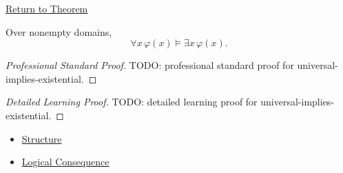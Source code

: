 \newpage
{}
\label{prf:universal-implies-existential}

\begin{remark*}[Return]
\hyperref[thm:universal-implies-existential]{Return to Theorem}
\end{remark*}

\begin{theorem*}
Over nonempty domains,
\[
\forall x\,\varphi(x)\models \exists x\,\varphi(x).
\]
\end{theorem*}

\begin{proof}[Professional Standard Proof]
\LRAProofBodyStart
TODO: professional standard proof for universal-implies-existential.
\end{proof}

\begin{proof}[Detailed Learning Proof]
\LRAProofBodyStart
TODO: detailed learning proof for universal-implies-existential.
\end{proof}

\begin{remark*}
\end{remark*}

\begin{dependencies}
\begin{itemize}
  \item \hyperref[def:structure]{Structure}
  \item \hyperref[def:log-consequence]{Logical Consequence}
\end{itemize}
\end{dependencies}

\clearpage
